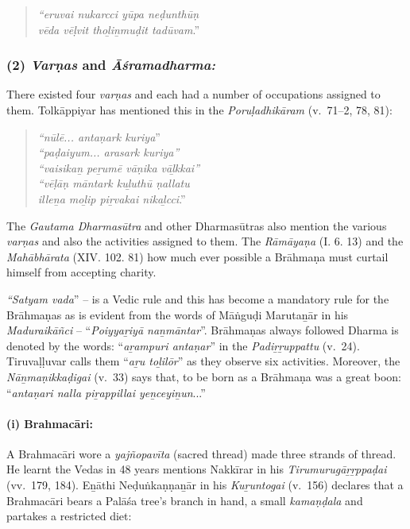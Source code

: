 \begin{quote}
\textit{“eruvai nukarcci yūpa neḍunthūṇ}\\\textit{vēda vēḷvit thoḻiṉmuḍit tadūvam}.”
\end{quote}


\subsubsection*{(2) \textit{Varṇas} and \textit{Āśramadharma:}}

\vskip -7pt

There existed four \textit{varṇas} and each had a number of occupations assigned to them. Tolkāppiyar has mentioned this in the \textit{Poruḷadhikāram} (v.~71–2, 78, 81):

\begin{quote}
\textit{“nūlē... antaṇark kuriya}”\\\textit{“paḍaiyum... arasark kuriya”}\\\textit{“vaisikaṉ peṟumē vāṇika vāḻkkai”}\\\textit{“vēḷāṇ māntark kuḻuthū ṇallatu}\\\textit{illeṉa moḻip piṟvakai nikaḻcci}.”
\end{quote}

The \textit{Gautama Dharmasūtra} and other Dharmasūtras also mention the various \textit{varṇas} and also the activities assigned to them. The \textit{Rāmāyaṇa} (I. 6. 13) and the \textit{Mahābhārata} (XIV. 102. 81) how much ever possible a Brāhmaṇa must curtail himself from accepting charity.

\textit{“Satyam vada}” – is a Vedic rule and this has become a mandatory rule for the Brāhmaṇas as is evident from the words of Māṅguḍi Marutaṉār in his \textit{Maduraikāñci} – “\textit{Poiyyaṟiyā naṉmāntar}”. Brāhmaṇas always followed Dharma is denoted by the words: “\textit{aṟampuri antaṇar}” in the \textit{Padiṟṟuppattu} (v.~24). Tiruvaḷḷuvar calls them “\textit{aṟu toḻilōr}” as they observe six activities. Moreover, the \textit{Nāṉmaṇikkaḍigai} (v.~33) says that, to be born as a Brāhmaṇa was a great boon: “\textit{antaṇari nalla piṟappillai yeṉceyiṉun}...”

\paragraph*{(i) Brahmacāri:}

\vskip -7pt

A Brahmacāri wore a \textit{yajñopavīta} (sacred thread) made three strands of thread. He learnt the Vedas in 48 years mentions Nakkīrar in his \textit{Tirumurugāṟṟppaḍai} (vv.~179, 184). Eṉāthi Neḍuṅkaṇṇaṉār in his \textit{Kuṟuntogai} (v.~156) declares that a Brahmacāri bears a Palāśa tree's branch in hand, a small \textit{kamaṇḍala} and partakes a restricted diet:

